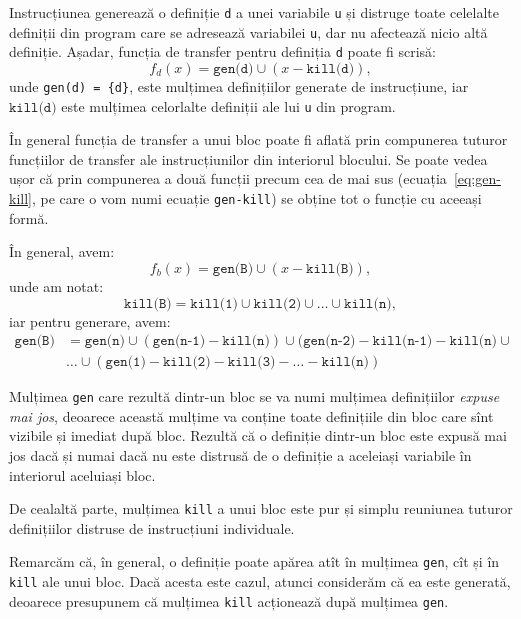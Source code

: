 Instrucțiunea generează o definiție \texttt{d} a unei variabile \texttt{u}
și distruge toate celelalte definiții din program care se adresează
variabilei \texttt{u}, dar nu afectează nicio altă definiție. Așadar,
funcția de transfer pentru definiția \texttt{d} poate fi scrisă:
\begin{equation}
    \label{eq:gen-kill}
    f_d(x) = \texttt{gen(d)} \cup (x - \texttt{kill(d)}),
\end{equation}
unde \texttt{gen(d) = \{d\}}, este mulțimea definițiilor
generate de instrucțiune, iar $ \texttt{kill(d)} $ este mulțimea
celorlalte definiții ale lui \texttt{u} din program.

În general funcția de transfer a unui bloc poate fi aflată prin
compunerea tuturor funcțiilor de transfer ale instrucțiunilor din interiorul
blocului. Se poate vedea ușor că prin compunerea a două funcții precum
cea de mai sus (ecuația~\eqref{eq:gen-kill}, pe care o vom numi ecuație
\texttt{gen-kill}) se obține tot o funcție cu aceeași formă.

În general, avem:
\begin{equation}
    \label{eq:fb}
    f_b(x) = \texttt{gen(B)} \cup (x - \texttt{kill(B)}),
\end{equation}
unde am notat:
\[
    \texttt{kill(B)} = \texttt{kill(1)} \cup \texttt{kill(2)} \cup \dots \cup \texttt{kill(n)},
\]
iar pentru generare, avem:
\begin{align*}
    \texttt{gen(B)} &= \texttt{gen(n)} \cup (\texttt{gen(n-1)} - \texttt{kill(n)}) \cup %
    (\texttt{gen(n-2)} - \texttt{kill(n-1)} - \texttt{kill(n)} \cup \\
                    & \dots \cup (\texttt{gen(1)} - \texttt{kill(2)} - \texttt{kill(3)} - %
                    \dots - \texttt{kill(n)})
\end{align*}

Mulțimea \texttt{gen} care rezultă dintr-un bloc se va numi mulțimea definițiilor
\emph{expuse mai jos}, deoarece această mulțime va conține toate definițiile
din bloc care sînt vizibile și imediat după bloc. Rezultă că o definiție dintr-un
bloc este expusă mai jos dacă și numai dacă nu este distrusă de o definiție a
aceleiași variabile în interiorul aceluiași bloc.

De cealaltă parte, mulțimea \texttt{kill} a unui bloc este pur și simplu reuniunea
tuturor definițiilor distruse de instrucțiuni individuale.

Remarcăm că, în general, o definiție poate apărea atît în mulțimea \texttt{gen},
cît și în \texttt{kill} ale unui bloc. Dacă acesta este cazul, atunci
considerăm că ea este generată, deoarece presupunem că mulțimea \texttt{kill}
acționează după mulțimea \texttt{gen}.


